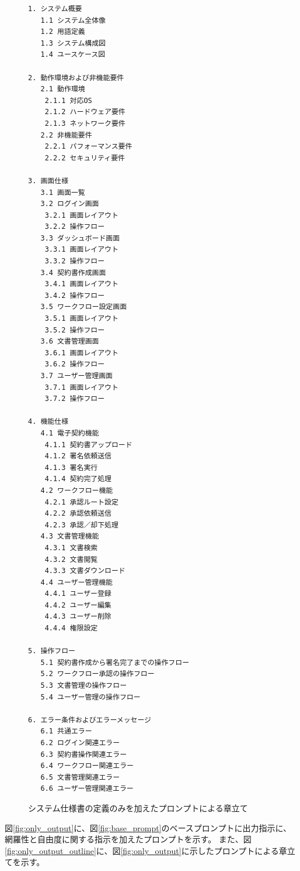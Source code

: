 \begin{figure}[tp]
\begin{tcolorbox}[
  colback=white,
  colframe=orange,
  fonttitle=\bfseries
]
\begin{multicols}{2}
\footnotesize
\ttfamily
\fontsize{7}{8}\selectfont
\begin{verbatim}
1. システム概要
   1.1 システム全体像
   1.2 用語定義
   1.3 システム構成図
   1.4 ユースケース図

2. 動作環境および非機能要件
   2.1 動作環境
    2.1.1 対応OS
    2.1.2 ハードウェア要件
    2.1.3 ネットワーク要件
   2.2 非機能要件
    2.2.1 パフォーマンス要件
    2.2.2 セキュリティ要件

3. 画面仕様
   3.1 画面一覧
   3.2 ログイン画面
    3.2.1 画面レイアウト
    3.2.2 操作フロー
   3.3 ダッシュボード画面
    3.3.1 画面レイアウト
    3.3.2 操作フロー
   3.4 契約書作成画面
    3.4.1 画面レイアウト
    3.4.2 操作フロー
   3.5 ワークフロー設定画面
    3.5.1 画面レイアウト
    3.5.2 操作フロー
   3.6 文書管理画面
    3.6.1 画面レイアウト
    3.6.2 操作フロー
   3.7 ユーザー管理画面
    3.7.1 画面レイアウト
    3.7.2 操作フロー

4. 機能仕様
   4.1 電子契約機能
    4.1.1 契約書アップロード
    4.1.2 署名依頼送信
    4.1.3 署名実行
    4.1.4 契約完了処理
   4.2 ワークフロー機能
    4.2.1 承認ルート設定
    4.2.2 承認依頼送信
    4.2.3 承認／却下処理
   4.3 文書管理機能
    4.3.1 文書検索
    4.3.2 文書閲覧
    4.3.3 文書ダウンロード
   4.4 ユーザー管理機能
    4.4.1 ユーザー登録
    4.4.2 ユーザー編集
    4.4.3 ユーザー削除
    4.4.4 権限設定

5. 操作フロー
   5.1 契約書作成から署名完了までの操作フロー
   5.2 ワークフロー承認の操作フロー
   5.3 文書管理の操作フロー
   5.4 ユーザー管理の操作フロー

6. エラー条件およびエラーメッセージ
   6.1 共通エラー
   6.2 ログイン関連エラー
   6.3 契約書操作関連エラー
   6.4 ワークフロー関連エラー
   6.5 文書管理関連エラー
   6.6 ユーザー管理関連エラー
\end{verbatim}
\end{multicols}
\end{tcolorbox}
\caption{システム仕様書の定義のみを加えたプロンプトによる章立て}
\label{fig:only_definition_outline}
\end{figure}

図\ref{fig:only_output}に、図\ref{fig:base_prompt}のベースプロンプトに出力指示に、網羅性と自由度に関する指示を加えたプロンプトを示す。
また、図\ref{fig:only_output_outline}に、図\ref{fig:only_output}に示したプロンプトによる章立てを示す。


